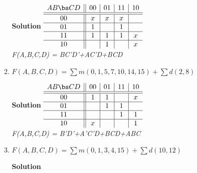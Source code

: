 \begin{enumerate}
\begin{enumerate}
                \begin{onlysolution}  \textbf{Solution} \itshape{
                        $
                        \begin{array} {c||c|c|c|c}
                            A B \bs C D   & 00 & 01 & 11 & 10 \\ \hline \hline
                            00        & x  & x  & x  &    \\ \hline
                            01        & 1  &    & 1  &    \\ \hline
                            11        & 1  & 1  & 1  & x  \\ \hline
                            10        &    & 1  &    & x  \\
                        \end{array}$  \\
                        F(A,B,C,D) = BC'D'+AC'D+BCD
                    }
                \end{onlysolution}

            \item $F(A,B,C,D)=\sum m(0,1,5,7,10,14,15)+\sum d(2,8)$

                \begin{onlysolution}  \textbf{Solution} \itshape{
                        $
                        \begin{array} {c||c|c|c|c}
                            A B \bs C D   & 00 & 01 & 11 & 10 \\ \hline \hline
                            00        & 1  & 1  &    & x  \\ \hline
                            01        &    & 1  & 1  &    \\ \hline
                            11        &    &    & 1  & 1  \\ \hline
                            10        & x  &    &    & 1  \\
                        \end{array}$ \\
                        F(A,B,C,D) = B'D'+A'C'D+BCD+ABC
                    }
                \end{onlysolution}
            \item $F(A,B,C,D)=\sum m(0,1,3,4,15)+\sum d(10,12)$

                \begin{onlysolution}  \textbf{Solution} \itshape{

}
\end{onlysolution}
\end{enumerate}
\end{enumerate}
